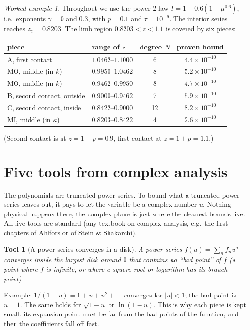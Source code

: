 \documentclass[11pt,a4paper]{article}
\newtheorem{tool}{Tool}
\theoremstyle{remark}
\newtheorem*{example}{Worked example}
\begin{document}
\begin{example}
Throughout we use the power-2 law $I=1-0.6(1-\mu^{0.6})$, i.e.\ exponents $\gamma=0$ and $0.3$,
with $p=0.1$ and $\tau=10^{-9}$. The interior series reaches $z_c=0.8203$. The limb region
$0.8203<z<1.1$ is covered by six pieces:
\begin{center}
\begin{tabular}{llcc}
\toprule
piece & range of $z$ & degree $N$ & proven bound\\
\midrule
A, first contact & $1.0462$--$1.1000$ & 6 & $4.4\times10^{-10}$\\
MO, middle (in $k$) & $0.9950$--$1.0462$ & 8 & $5.2\times10^{-10}$\\
MO, middle (in $k$) & $0.9462$--$0.9950$ & 8 & $4.7\times10^{-10}$\\
B, second contact, outside & $0.9000$--$0.9462$ & 7 & $5.9\times10^{-10}$\\
C, second contact, inside & $0.8422$--$0.9000$ & 12 & $8.2\times10^{-10}$\\
MI, middle (in $\kappa$) & $0.8203$--$0.8422$ & 4 & $2.6\times10^{-10}$\\
\bottomrule
\end{tabular}
\end{center}
(Second contact is at $z=1-p=0.9$, first contact at $z=1+p=1.1$.)
\end{example}

\section{Five tools from complex analysis}
\label{sec:tools}

The polynomials are truncated power series. To bound what a truncated power series leaves out, it
pays to let the variable be a complex number $u$. Nothing physical happens there; the complex plane
is just where the cleanest bounds live. All five tools are standard (any textbook on complex
analysis, e.g.\ the first chapters of Ahlfors or of Stein \& Shakarchi).

\begin{tool}[A power series converges in a disk]
A power series $f(u)=\sum_nf_nu^n$ converges inside the largest disk around $0$ that contains no
``bad point'' of $f$ (a point where $f$ is infinite, or where a square root or logarithm has its
branch point).
\end{tool}
Example: $1/(1-u)=1+u+u^2+\dots$ converges for $|u|<1$; the bad point is $u=1$. The same holds for
$\sqrt{1-u}$ or $\ln(1-u)$. This is why each piece is kept small: its expansion point must be far
from the bad points of the function, and then the coefficients fall off fast.
\end{document}
